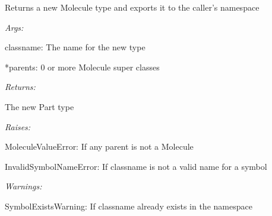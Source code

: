 \documentclass[letterpaper,10pt,english]{sphinxmanual}
\begin{document}
\begin{fulllineitems}
\label{modules/index:aosb.core.declareNewMolecule}
Returns a new Molecule type and exports it to the caller's namespace

\begin{DUlineblock}{0em}
\item[] \emph{Args:}
\item[]
\begin{DUlineblock}{\DUlineblockindent}
\item[] classname: The name for the new type
\item[] *parents: 0 or more Molecule super classes
\end{DUlineblock}
\end{DUlineblock}

\begin{DUlineblock}{0em}
\item[] \emph{Returns:}
\item[]
\begin{DUlineblock}{\DUlineblockindent}
\item[] The new Part type
\end{DUlineblock}
\end{DUlineblock}

\begin{DUlineblock}{0em}
\item[] \emph{Raises:}
\item[]
\begin{DUlineblock}{\DUlineblockindent}
\item[] MoleculeValueError: If any parent is not a Molecule
\item[] InvalidSymbolNameError: If classname is not a valid name for a symbol
\end{DUlineblock}
\end{DUlineblock}

\begin{DUlineblock}{0em}
\item[] \emph{Warnings:}
\item[]
\begin{DUlineblock}{\DUlineblockindent}
\item[] SymbolExistsWarning: If classname already exists in the namespace
\end{DUlineblock}
\end{DUlineblock}

\end{fulllineitems}
\end{document}
